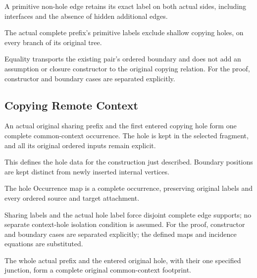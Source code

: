 A primitive non-hole edge retains its exact label on both actual sides, including interfaces and the absence of hidden additional edges.
\par{}

The actual complete prefix's primitive labels exclude shallow copying holes, on every branch of its original tree.
\par{}

Equality transports the existing pair's ordered boundary and does not add an assumption or closure constructor to the original copying relation.
For the proof, constructor and boundary cases are separated explicitly.
\par{}

\subsection{Copying Remote Context}
An actual original sharing prefix and the first entered copying hole form one complete common-context occurrence. The hole is kept in the selected fragment, and all its original ordered inputs remain explicit.

This defines the hole data for the construction just described. Boundary positions are kept distinct from newly inserted internal vertices.
\par{}

The hole Occurrence map is a complete occurrence, preserving original labels and every ordered source and target attachment.
\par{}

Sharing labels and the actual hole label force disjoint complete edge supports; no separate context-hole isolation condition is assumed.
For the proof, constructor and boundary cases are separated explicitly; the defined maps and incidence equations are substituted.
\par{}

The whole actual prefix and the entered original hole, with their one specified junction, form a complete original common-context footprint.
\par{}

